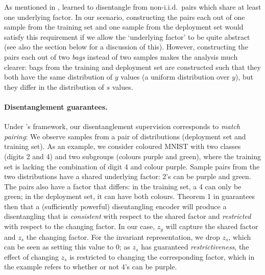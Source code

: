 As mentioned in ,
\citet{locatello2020weakly} learned to disentangle from non-i.i.d.\ pairs
which share at least one underlying factor.
In our scenario, constructing the pairs each out of one sample from the training set and one sample from the deployment set
would satisfy this requirement if we allow the `underlying factor' to be quite abstract
(see also the section below for a discussion of this).
However, constructing the pairs each out of two \emph{bags} instead of two samples
makes the analysis much clearer:
bags from the training and deployment set are constructed such
that they both have the same distribution of \(y\) values (a uniform distribution over \(y\)),
but they differ in the distribution of \(s\) values.

\paragraph{Disentanglement guarantees.}
%
%
%
Under \citet{ShuCheKumErmetal20}'s framework, our disentanglement supervision corresponds to \emph{match pairing}:
We observe samples from a pair of distributions (deployment set and training set).
As an example, we consider coloured MNIST with two classes (digits 2 and 4) and two subgroups (colours purple and green), where the training set is lacking the combination of digit 4 and colour purple.
Sample pairs from the two distributions have a shared underlying factor: 2's can be purple and green.
The pairs also have a factor that differs: in the training set, a 4 can only be green; in the deployment set, it can have both colours.
Theorem 1 in \citep{ShuCheKumErmetal20} guarantees then that a (sufficiently powerful) disentangling encoder will produce a disentangling that is \emph{consistent} with respect to the shared factor and \emph{restricted} with respect to the changing factor.
In our case, $z_y$ will capture the shared factor and $z_s$ the changing factor.
For the invariant representation, we drop $z_s$, which can be seen as setting this value to 0; as $z_s$ has guaranteed \emph{restrictiveness}, the effect of changing $z_s$ is restricted to changing the corresponding factor,
which in the example refers to whether or not 4's can be purple.
%
%
%

